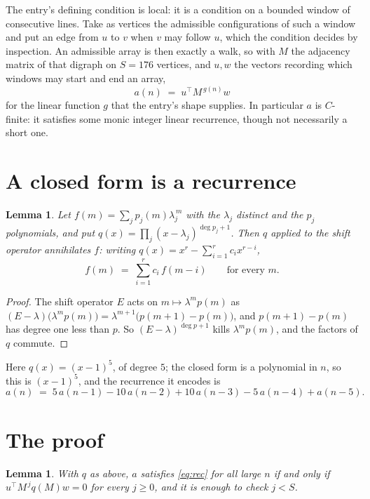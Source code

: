 \documentclass[11pt,a4paper]{article}
\theoremstyle{plain}
\newtheorem{lemma}[theorem]{Lemma}
\theoremstyle{definition}
\begin{document}
The entry's defining condition is local: it is a condition on a bounded window of consecutive lines. Take as vertices the
admissible configurations of such a window and put an edge from $u$ to $v$ when $v$ may
follow $u$, which the condition decides by inspection. An admissible array is then exactly a
walk, so with $M$ the adjacency matrix of that digraph on $S=176$ vertices, and $u,w$ the
vectors recording which windows may start and end an array,
\[
a(n)\;=\;u^{\!\top}M^{\,g(n)}w
\]
for the linear function $g$ that the entry's shape supplies. In particular $a$ is
$C$-finite: it satisfies some monic integer linear recurrence, though not necessarily a short
one.

\section{A closed form is a recurrence}

\begin{lemma}\label{lem:ann}
Let $f(m)=\sum_{j}p_j(m)\lambda_j^{\,m}$ with the $\lambda_j$ distinct and the $p_j$
polynomials, and put $q(x)=\prod_j(x-\lambda_j)^{\deg p_j+1}$. Then $q$ applied to the shift
operator annihilates $f$: writing $q(x)=x^{r}-\sum_{i=1}^{r}c_ix^{r-i}$,
\[
f(m)\;=\;\sum_{i=1}^{r}c_i\,f(m-i)\qquad\text{for every }m.
\]
\end{lemma}

\begin{proof}
The shift operator $E$ acts on $m\mapsto\lambda^{m}p(m)$ as
$(E-\lambda)\bigl(\lambda^{m}p(m)\bigr)=\lambda^{m+1}\bigl(p(m+1)-p(m)\bigr)$, and
$p(m+1)-p(m)$ has degree one less than $p$. So $(E-\lambda)^{\deg p+1}$ kills
$\lambda^{m}p(m)$, and the factors of $q$ commute.
\end{proof}

Here $q(x)=(x-1)^{5}$, of degree $5$; the closed form is a polynomial in $n$, so this is $(x-1)^{5}$, and the recurrence it encodes is
\begin{equation}\label{eq:rec}
a(n)\;=\;5\,a(n-1) - 10\,a(n-2) + 10\,a(n-3) - 5\,a(n-4) + a(n-5).
\end{equation}

\section{The proof}

\begin{lemma}\label{lem:crit}
With $q$ as above, $a$ satisfies \eqref{eq:rec} for all large $n$ if and only if
$u^{\!\top}M^{\,j}q(M)w=0$ for every $j\ge0$, and it is enough to check $j<S$.
\end{lemma}
\end{document}
